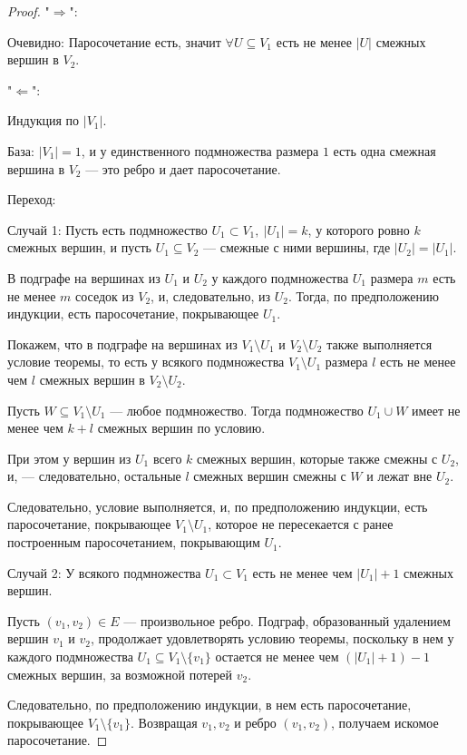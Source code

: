\begin{proof}

    "$\Rightarrow$": 
    
    Очевидно: Паросочетание есть, значит $\forall U \subseteq V_1$ есть не менее $|U|$ смежных вершин в $V_2$.
    
    "$\Leftarrow$": 
    
    Индукция по $|V_1|$.
    
    База: $|V_1| = 1$, и у единственного подмножества размера $1$ есть одна смежная вершина в $V_2$ --- это ребро и дает паросочетание.
    
    Переход: 
    
    Случай 1: Пусть есть подмножество $U_1 \subset V_1,~|U_1| = k$, у которого ровно $k$ смежных вершин, и пусть $U_1 \subseteq V_2$ --- смежные с ними вершины, где $|U_2| = |U_1|$.
    
    В подграфе на вершинах из $U_1$ и $U_2$ у каждого подмножества $U_1$ размера $m$ есть не менее $m$ соседок из $V_2$, и, следовательно, из $U_2$. Тогда, по предположению индукции, есть паросочетание, покрывающее $U_1$.
    
    Покажем, что в подграфе на вершинах из $V_1 \setminus U_1$ и $V_2 \setminus U_2$ также выполняется условие теоремы, то есть у всякого подмножества $V_1 \setminus U_1$ размера $l$ есть не менее чем $l$ смежных вершин в $V_2 \setminus U_2$.
    
    Пусть $W \subseteq V_1 \setminus U_1$ --- любое подмножество. Тогда подмножество $U_1 \cup W$ имеет не менее чем $k+l$ смежных вершин по условию.
    
    При этом у вершин из $U_1$ всего $k$ смежных вершин, которые также смежны с $U_2$, и, --- следовательно, остальные $l$ смежных вершин смежны с $W$ и лежат вне $U_2$.
    
    Следовательно, условие выполняется, и, по предположению индукции, есть паросочетание, покрывающее $V_1 \setminus U_1$, которое не пересекается с ранее построенным паросочетанием, покрывающим $U_1$.
    
    Случай 2: У всякого подмножества $U_1 \subset V_1$ есть не менее чем $|U_1| + 1$ смежных вершин.
    
    Пусть $(v_1, v_2) \in E$ --- произвольное ребро. Подграф, образованный удалением вершин $v_1$ и $v_2$, продолжает удовлетворять условию теоремы, поскольку в нем у каждого подмножества $U_1 \subseteq V_1 \setminus \{v_1\}$ остается не менее чем $(|U_1| + 1) - 1$ смежных вершин, за возможной потерей $v_2$.
    
    Следовательно, по предположению индукции, в нем есть паросочетание, покрывающее $V_1 \setminus \{v_1\}$. Возвращая $v_1, v_2$ и ребро $(v_1, v_2)$, получаем искомое паросочетание.
\end{proof}